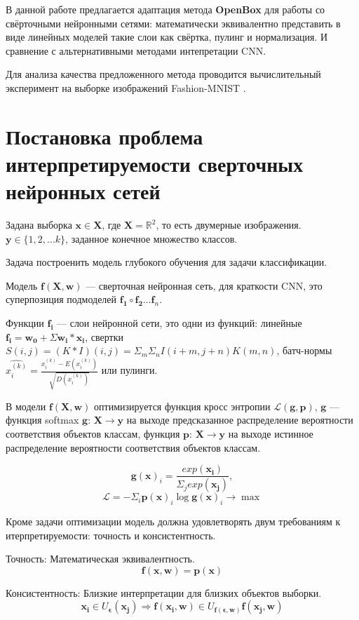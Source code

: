 \documentclass[12pt]{article}
\begin{document}
В данной работе предлагается адаптация метода \textbf{OpenBox} для работы со свёрточными нейронными сетями: математически эквивалентно представить в виде линейных моделей такие слои как свёртка, пулинг и нормализация. И сравнение с альтернативными методами интепретации CNN.

Для анализа качества предложенного метода проводится вычислительный эксперимент на выборке изображений Fashion-MNIST \citep{fashionmnist}.



\section{Постановка проблема интерпретируемости сверточных нейронных сетей}
\label{sec:headings}

Задана выборка $\mathbf{x} \in \mathbf{X}$, где $\mathbf{X} = \mathbb{R}^2$, то есть двумерные изображения. $\mathbf{y} \in \{1, 2, ... k\}$, заданное конечное множество классов.

Задача построенить модель глубокого обучения для задачи классификации.

Модель $\mathbf{f}(\mathbf{X}, \mathbf{w})$ --- сверточная нейронная сеть, для краткости CNN, это суперпозиция подмоделей $\mathbf{f_1} \circ \mathbf{f_2} \dots \mathbf{f}_n$.

Функции $\mathbf{f_i}$ --- слои нейронной сети, это одни из функций: линейные $\mathbf{f_i} = \mathbf{w_0} + \Sigma \mathbf{w_i} * \mathbf{x_i}$, свертки $S(i,j) = (K * I)(i,j) = \Sigma_m \Sigma_n I(i + m, j + n)K(m, n)$, батч-нормы $\hat{x_i^{(k)}} = \frac{x_i^{(k)} - E(x_i^{(k)})}{\sqrt{D(x_i^{(k)})}}$ или пулинги.

В модели $\mathbf{f}(\mathbf{X}, \mathbf{w})$ оптимизируется функция кросс энтропии $\mathcal{L}(\mathbf{g}, \mathbf{p})$, $\mathbf{g}$ --- функция softmax $\mathbf{g}$: $\mathbf{X} \to \mathbf{y}$ на выходе предсказанное распределение вероятности соответствия объектов классам, функция $\mathbf{p}$: $\mathbf{X} \to \mathbf{y}$ на выходе истинное распределение вероятности соответствия объектов классам.

$$\mathbf{g}(\mathbf{x})_i = \frac{exp(\mathbf{x_i})}{\Sigma_j exp(\mathbf{x_j})},$$
$$\mathcal{L} = -\Sigma_i \mathbf{p}(\mathbf{x})_i \log \mathbf{g}(\mathbf{x})_i \to \max$$

Кроме задачи оптимизации модель должна удовлетворять двум требованиям к итерпретируемости: $\textbf{точность}$ и $\textbf{консистентность}$.
\begin{description}
    \item{Точность}:
    Математическая эквивалентность.
    $$\mathbf{f}(\mathbf{x}, \mathbf{w}) = \mathbf{p}(\mathbf{x})$$ 
    \item{Консистентность}:
    Близкие интерпретации для близких объектов выборки. $$\mathbf{x_i} \in U_\mathbf{\epsilon}(\mathbf{x_j}) \Longrightarrow \mathbf{f}(\mathbf{x_i}, \mathbf{w}) \in U_{\mathbf{f}(\mathbf{\epsilon}, \mathbf{w})}\mathbf{f}(\mathbf{x_j}, \mathbf{w})$$
\end{description}
\end{document}
